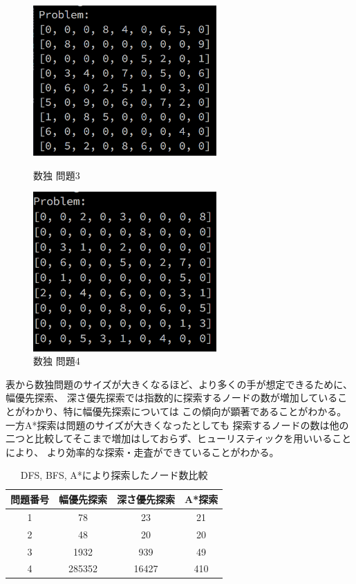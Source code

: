 \documentclass[uplatex]{jsarticle}
\begin{document}
\begin{figure}[htbp]
 \begin{minipage}{0.5\hsize}
  \begin{center}
   \includegraphics[width=70mm]{img/sudoku_3.png}
  \end{center}
  \caption{数独 問題3}
  \label{fig:one}
 \end{minipage}
 \begin{minipage}{0.5\hsize}
  \begin{center}
   \includegraphics[width=70mm]{img/sudoku_4.png}
  \end{center}
  \caption{数独 問題4}
  \label{fig:two}
 \end{minipage}
\end{figure}
表から数独問題のサイズが大きくなるほど、より多くの手が想定できるために、幅優先探索、
深さ優先探索では指数的に探索するノードの数が増加していることがわかり、特に幅優先探索については
この傾向が顕著であることがわかる。一方A*探索は問題のサイズが大きくなったとしても
探索するノードの数は他の二つと比較してそこまで増加はしておらず、ヒューリスティックを用いいることにより、
より効率的な探索・走査ができていることがわかる。

\begin{table}[htb]
  \begin{center}
      \caption{DFS, BFS, A*により探索したノード数比較}
  \begin{tabular}{|c|c|c|c|} \hline
    問題番号 & 幅優先探索 & 深さ優先探索 & A*探索\\  \hline \hline
    1 & 78 & 23 & 21 \\
    2 & 48 & 20 & 20 \\
    3 & 1932 & 939 & 49 \\
    4 & 285352 & 16427 & 410 \\
    \hline
  \end{tabular}
  \end{center}
\end{table}
\end{document}
